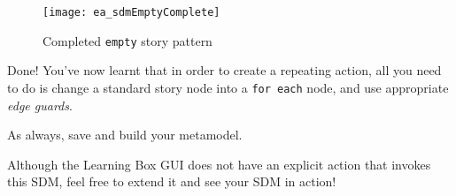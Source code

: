 \begin{stepbystep}
\begin{figure}[htbp]
\begin{center}
  \texttt{[image: ea\_sdmEmptyComplete]}
  \caption{Completed \texttt{empty} story pattern}  
  \label{ea:sdm_end}
\end{center}
\end{figure}
\FloatBarrier

\item Done! You've now learnt that in order to create a repeating action, all you need to do is change a standard story node
into a \texttt{for each} node, and use appropriate \emph{edge guards}. 

\vspace{0.5cm}

\item As always, save and build your metamodel.

\vspace{0.5cm}

\item Although the Learning Box GUI does not have an explicit action that invokes this SDM, feel free to extend it and see your SDM in
action!

\end{stepbystep}

